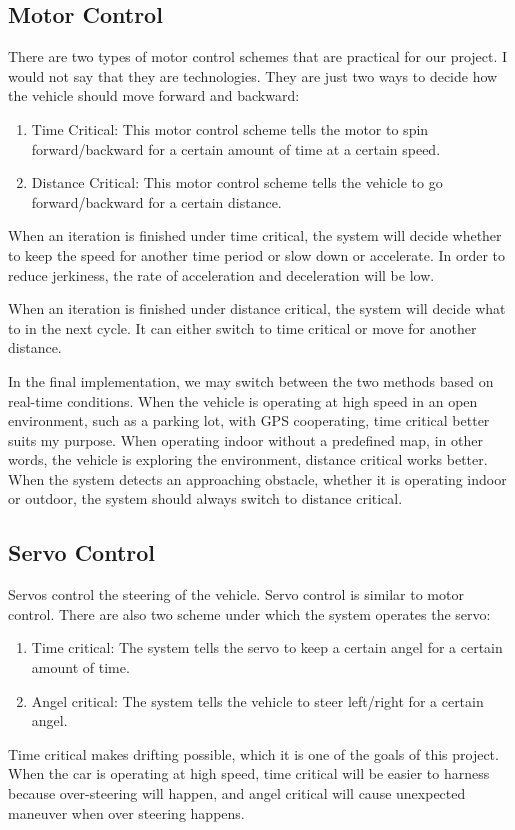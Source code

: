 \documentclass[compsoc,draftclsnofoot,onecolumn,10pt]{IEEEtran}
\begin{document}
\subsection{Motor Control}
There are two types of motor control schemes that are practical for our project. 
I would not say that they are technologies. They are just two ways to decide 
how the vehicle should move forward and backward:
\begin{enumerate}
\item Time Critical: This motor control scheme tells the motor to spin 
forward/backward for a certain amount of time at a certain speed.
\item Distance Critical: This motor control scheme tells the vehicle to go 
forward/backward for a certain distance.
\end{enumerate}
When an iteration is finished under time critical, the system will decide whether 
to keep the speed for another time period or slow down or accelerate. In order 
to reduce jerkiness, the rate of acceleration and deceleration will be low.\par

When an iteration is finished under distance critical, the system will decide what 
to in the next cycle. It can either switch to time critical or move for another 
distance.\par

In the final implementation, we may switch between the two methods based on 
real-time conditions. When the vehicle is operating at high speed in an open 
environment, such as a parking lot, with GPS cooperating, time critical better 
suits my purpose. When operating indoor without a predefined map, in other words, 
the vehicle is exploring the environment, distance critical works better. When the 
system detects an approaching obstacle, whether it is operating indoor or outdoor, 
the system should always switch to distance critical.\par

\subsection{Servo Control}
Servos control the steering of the vehicle. Servo control is similar to motor control. 
There are also two scheme under which the system operates the servo:
\begin{enumerate}
\item Time critical: The system tells the servo to keep a certain angel for a certain 
amount of time.
\item Angel critical: The system tells the vehicle to steer left/right for a certain 
angel. 
\end{enumerate}
Time critical makes drifting possible, which it is one of the goals of this project. 
When the car is operating at high speed, time critical will be easier to harness because 
over-steering will happen, and angel critical will cause unexpected maneuver when 
over steering happens.\par
\end{document}
